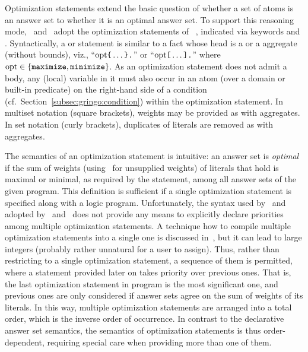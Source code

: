 Optimization statements extend the basic question of
whether a set of atoms is an answer set to
whether it is an optimal answer set.
To support this reasoning mode, \gringo\ and \clingo\ adopt the
optimization statements of \lparse~\cite{lparseManual},
indicated via keywords  and .
Syntactically, a  or  statement
is similar to a fact whose head is a  or a 
aggregate (without bounds),
viz.,
``$\textrm{opt}\code{\char`\{}\dots\code{\char`\}}\code{.}$'' or
``$\textrm{opt}\texttt{[}\dots\texttt{]}\texttt{.}$'' where
$\textrm{opt}\in\{\const{maximize},\linebreak[1]\const{minimize}\}$.
As an optimization statement does not admit a body, any (local) variable
in it must also occur in an atom (over a domain or built-in predicate)
on the right-hand side of a condition (cf.\ Section~\ref{subsec:gringo:condition})
within the optimization statement.
In multiset notation (square brackets),
weights may be provided as with  aggregates. %
In set notation (curly brackets),
duplicates of literals are removed
as with  aggregates.

The semantics of an optimization statement is intuitive:
an answer set is \emph{optimal} if the sum of weights
(using~ for unsupplied weights)
of literals that hold is maximal or minimal, as required by the statement,
among all answer sets of the given program.
This definition is sufficient if a single optimization statement is specified
along with a logic program.
Unfortunately, the syntax used by \lparse\ and adopted by \gringo\ and \clingo\
does not provide any means to explicitly declare priorities among multiple
optimization statements.
A technique how to compile multiple optimization statements into a single one
is discussed in~\cite{siniso02a},
but it can lead to large integers
(probably rather unnatural for a user to assign).
Thus, rather than restricting to a single optimization statement,
a sequence of them is permitted,
where a statement provided later on takes priority over previous ones.
That is, the last optimization statement in program is the most significant one,
and previous ones are only considered if answer sets agree on the sum of 
weights of its literals.
In this way, multiple optimization statements are arranged into a total order,
which is the inverse order of occurrence.
In contrast to the declarative answer set semantics, the semantics of
optimization statements is thus order-dependent,
requiring special care when providing more than one of them.

